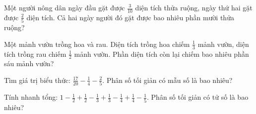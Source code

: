 \begin{ex}
  Một người nông dân ngày đầu gặt được $\frac{3}{10}$ diện tích thửa ruộng, ngày thứ hai gặt được $\frac{2}{5}$ diện tích. Cả hai ngày người đó gặt được bao nhiêu phần mười thửa ruộng?
\end{ex}

\begin{ex}
  Một mảnh vườn trồng hoa và rau. Diện tích trồng hoa chiếm $\frac{1}{3}$ mảnh vườn, diện tích trồng rau chiếm $\frac{1}{2}$ mảnh vườn. Phần diện tích còn lại chiếm bao nhiêu phần sáu mảnh vườn?
\end{ex}

\begin{ex}
  Tìm giá trị biểu thức: $\frac{17}{20} - \frac{1}{4} - \frac{2}{5}$. Phân số tối giản có mẫu số là bao nhiêu?
\end{ex}

\begin{ex}
  Tính nhanh tổng: $1 - \frac{1}{2} + \frac{1}{2} - \frac{1}{3} + \frac{1}{3} - \frac{1}{4} + \frac{1}{4} - \frac{1}{5}$. Phân số tối giản có tử số là bao nhiêu?
\end{ex}
